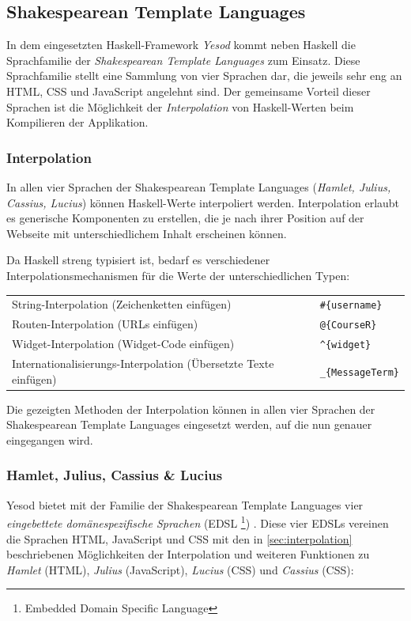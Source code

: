 \documentclass[11pt,a4paper,twoside,ngerman]{article}
\begin{document}
\subsection{Shakespearean Template Languages} \label{sec:stl}
In dem eingesetzten Haskell-Framework \emph{Yesod} kommt neben Haskell die Sprachfamilie der \emph{Shakespearean Template Languages} zum Einsatz. Diese Sprachfamilie stellt eine Sammlung von vier Sprachen dar, die jeweils sehr eng an HTML, CSS und JavaScript angelehnt sind. Der gemeinsame Vorteil dieser Sprachen ist die Möglichkeit der \textit{Interpolation} von Haskell-Werten beim Kompilieren der Applikation. \cite{web:yesodstl}

\subsubsection{Interpolation} \label{sec:interpolation}
In allen vier Sprachen der Shakespearean Template Languages (\textit{Hamlet, Julius, Cassius, Lucius}) können Haskell-Werte interpoliert werden. Interpolation erlaubt es generische Komponenten zu erstellen, die je nach ihrer Position auf der Webseite mit unterschiedlichem Inhalt erscheinen können.

Da Haskell streng typisiert ist, bedarf es verschiedener Interpolationsmechanismen für die Werte der unterschiedlichen Typen:

\bigskip
\begin{tabular}{l|l}
    String-Interpolation (Zeichenketten einfügen) & \lstinline/#{username}/ \\
    Routen-Interpolation (URLs einfügen) & \lstinline/@{CourseR}/ \\
    Widget-Interpolation (Widget-Code einfügen) & \lstinline/^{widget}/ \\
    Internationalisierungs-Interpolation (Übersetzte Texte einfügen) & \lstinline/_{MessageTerm}/
\end{tabular}

\bigskip
\noindent
Die gezeigten Methoden der Interpolation können in allen vier Sprachen der Shakespearean Template Languages eingesetzt werden, auf die nun genauer eingegangen wird.

\subsubsection{Hamlet, Julius, Cassius \& Lucius}
Yesod bietet mit der Familie der Shakespearean Template Languages vier \textit{eingebettete domänespezifische Sprachen} (EDSL \footnote{Embedded Domain Specific Language}) \cite{web:haskell-edsl}. Diese vier EDSLs vereinen die Sprachen HTML, JavaScript und CSS mit den in \autoref{sec:interpolation} beschriebenen Möglichkeiten der Interpolation und weiteren Funktionen zu \textit{Hamlet} (HTML), \textit{Julius} (JavaScript), \textit{Lucius} (CSS) und \textit{Cassius} (CSS):
\end{document}
